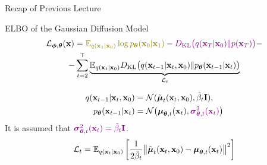 \documentclass{beamer}
\begin{document}
\begin{frame}
\titlepage
    \resetonslide
\end{frame}
\begin{frame}{Recap of Previous Lecture}
	\begin{block}{ELBO of the Gaussian Diffusion Model}
		\vspace{-0.7cm}
		\begin{multline*}
			\cL_{\bphi, \btheta}(\bx) =  {\color{olive}\bbE_{q(\bx_1 | \bx_0)} \log \pt(\bx_0 | \bx_1)} - {\color{violet}\KL\bigl(q(\bx_T | \bx_0) \| p(\bx_T)\bigr)} - \\
			- \sum_{t=2}^\top  \underbrace{ \bbE_{q(\bx_t | \bx_0)}\KL \bigl(q(\bx_{t-1} | \bx_t, \bx_0) \| \pt(\bx_{t-1} | \bx_t)\bigr)}_{\cL_t}
		\end{multline*}
		\vspace{-1.0cm}
	\end{block}
	\begin{align*}
		q(\mathbf{x}_{t-1} | \mathbf{x}_t, \mathbf{x}_0) &= \mathcal{N}(\tilde{\boldsymbol{\mu}}_t(\mathbf{x}_t, \mathbf{x}_0), \tilde{\beta}_t \mathbf{I}), \\
		p_{\boldsymbol{\theta}}(\mathbf{x}_{t - 1} | \mathbf{x}_t) &= \mathcal{N} \bigl(\boldsymbol{\mu}_{\boldsymbol{\theta}, t}(\mathbf{x}_t), {\color{violet}\boldsymbol{\sigma}_{\boldsymbol{\theta}, t}^2(\mathbf{x}_t)}\bigr)
	\end{align*}
	It is assumed that ${\color{violet}\boldsymbol{\sigma}_{\boldsymbol{\theta}, t}^2(\mathbf{x}_t) = \tilde{\beta}_t \mathbf{I}}$.
	\[
		\mathcal{L}_t = \mathbb{E}_{q(\mathbf{x}_t | \mathbf{x}_0)} \left[\frac{1}{2\tilde{\beta}_t} \bigl\| \tilde{\boldsymbol{\mu}}_t(\mathbf{x}_t, \mathbf{x}_0) - \boldsymbol{\mu}_{\boldsymbol{\theta}, t}(\mathbf{x}_t) \bigr\|^2  \right]
	\]
\end{frame}
\end{document}
